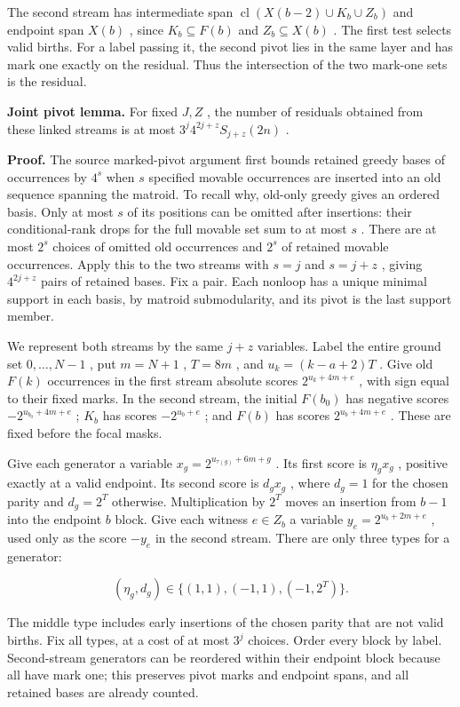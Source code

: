 \documentclass[11pt]{article}
\begin{document}
The second stream has intermediate span \(\operatorname{cl}(X(b-2)\cup K_b\cup Z_b)\) and endpoint span \(X(b)\) , since \(K_b\subseteq F(b)\) and \(Z_b\subseteq X(b)\) . The first test selects valid births. For a label passing it, the second pivot lies in the same layer and has mark one exactly on the residual. Thus the intersection of the two mark-one sets is the residual.

\textbf{Joint pivot lemma.} For fixed \(J,Z\) , the number of residuals obtained from these linked streams is at most \(3^j4^{2j+z}S_{j+z}(2n)\) .

\textbf{Proof.} The source marked-pivot argument first bounds retained greedy bases of occurrences by \(4^s\) when \(s\) specified movable occurrences are inserted into an old sequence spanning the matroid. To recall why, old-only greedy gives an ordered basis. Only at most \(s\) of its positions can be omitted after insertions: their conditional-rank drops for the full movable set sum to at most \(s\) . There are at most \(2^s\) choices of omitted old occurrences and \(2^s\) of retained movable occurrences. Apply this to the two streams with \(s=j\) and \(s=j+z\) , giving \(4^{2j+z}\) pairs of retained bases. Fix a pair. Each nonloop has a unique minimal support in each basis, by matroid submodularity, and its pivot is the last support member.

We represent both streams by the same \(j+z\) variables. Label the entire ground set \(0,\ldots,N-1\) , put \(m=N+1\) , \(T=8m\) , and \(u_k=(k-a+2)T\) . Give old \(F(k)\) occurrences in the first stream absolute scores \(2^{u_k+4m+e}\) , with sign equal to their fixed marks. In the second stream, the initial \(F(b_0)\) has negative scores \(-2^{u_{b_0}+4m+e}\) ; \(K_b\) has scores \(-2^{u_b+e}\) ; and \(F(b)\) has scores \(2^{u_b+4m+e}\) . These are fixed before the focal masks.

Give each generator a variable \(x_g=2^{u_{\tau(g)}+6m+g}\) . Its first score is \(\eta_gx_g\) , positive exactly at a valid endpoint. Its second score is \(d_gx_g\) , where \(d_g=1\) for the chosen parity and \(d_g=2^T\) otherwise. Multiplication by \(2^T\) moves an insertion from \(b-1\) into the endpoint \(b\) block. Give each witness \(e\in Z_b\) a variable \(y_e=2^{u_b+2m+e}\) , used only as the score \(-y_e\) in the second stream. There are only three types for a generator:

\[(\eta_g,d_g)\in\{(1,1),(-1,1),(-1,2^T)\}.\]

The middle type includes early insertions of the chosen parity that are not valid births. Fix all types, at a cost of at most \(3^j\) choices. Order every block by label. Second-stream generators can be reordered within their endpoint block because all have mark one; this preserves pivot marks and endpoint spans, and all retained bases are already counted.
\end{document}
